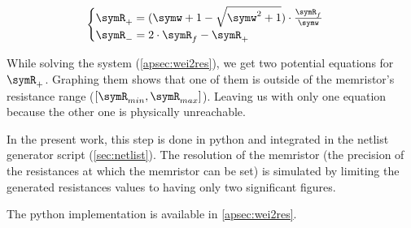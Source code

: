 \begin{equation}
  \label{eq:wei2res2}
  \begin{cases}
    \symR_+= (\symw+1-\sqrt{\symw^2+1})\cdot\frac{\symR_f}{\symw}\\
    \symR_-=2\cdot \symR_f -\symR_+
  \end{cases}
\end{equation}

While solving the system (\cref{apsec:wei2res}), we get two potential equations for $\symR_+$. Graphing them shows that one of them is outside of the memristor's resistance range ($[\symR_{min},\symR_{max}]$). Leaving us with only one equation because the other one is physically unreachable.

In the present work, this step is done in python and integrated in the netlist generator script (\cref{sec:netlist}). The resolution of the memristor (the precision of the resistances at which the memristor can be set) is simulated by limiting the generated resistances values to having only two significant figures.

The python implementation is available in \cref{apsec:wei2res}.

